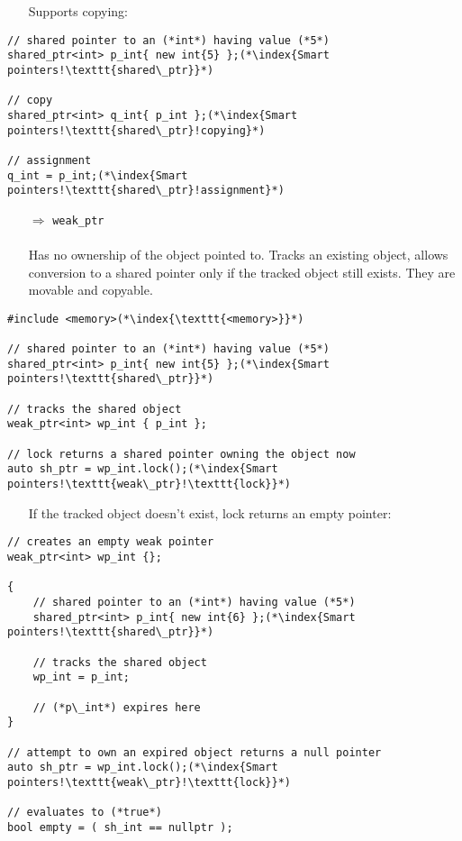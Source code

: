 \documentclass[10pt]{article}
\begin{document}
\begin{enumerate}
\item[] Supports copying:
\end{enumerate}
\begin{lstlisting}
// shared pointer to an (*int*) having value (*5*)
shared_ptr<int> p_int{ new int{5} };(*\index{Smart pointers!\texttt{shared\_ptr}}*)

// copy
shared_ptr<int> q_int{ p_int };(*\index{Smart pointers!\texttt{shared\_ptr}!copying}*)

// assignment
q_int = p_int;(*\index{Smart pointers!\texttt{shared\_ptr}!assignment}*)
\end{lstlisting}
\begin{enumerate}
\item[$\Rightarrow$] \texttt{weak\_ptr}\\ \\
Has no ownership of the object pointed to. Tracks an existing object, allows conversion to a shared pointer only if the tracked object still exists. They are movable and copyable. 
\end{enumerate}
\begin{lstlisting}
#include <memory>(*\index{\texttt{<memory>}}*)

// shared pointer to an (*int*) having value (*5*)
shared_ptr<int> p_int{ new int{5} };(*\index{Smart pointers!\texttt{shared\_ptr}}*)

// tracks the shared object
weak_ptr<int> wp_int { p_int };

// lock returns a shared pointer owning the object now
auto sh_ptr = wp_int.lock();(*\index{Smart pointers!\texttt{weak\_ptr}!\texttt{lock}}*)
\end{lstlisting}
\begin{enumerate}
\item[] If the tracked object doesn't exist, lock returns an empty pointer:
\end{enumerate}
\begin{lstlisting}
// creates an empty weak pointer
weak_ptr<int> wp_int {};

{
    // shared pointer to an (*int*) having value (*5*)
    shared_ptr<int> p_int{ new int{6} };(*\index{Smart pointers!\texttt{shared\_ptr}}*)

    // tracks the shared object
    wp_int = p_int;
    
    // (*p\_int*) expires here
}

// attempt to own an expired object returns a null pointer
auto sh_ptr = wp_int.lock();(*\index{Smart pointers!\texttt{weak\_ptr}!\texttt{lock}}*)

// evaluates to (*true*)
bool empty = ( sh_int == nullptr );
\end{lstlisting}
\end{document}
